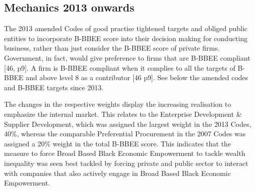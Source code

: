 \subsection{Mechanics 2013 onwards}
The 2013 amended Codes of good practise tightened targets and obliged public entities to incorporate B-BBEE score into their decision making for conducting business, rather than just consider the B-BBEE score of private firms. Government, in fact, would give preference to firms that are B-BBEE compliant [46, p9]. A firm is B-BBEE compliant when it complies to all the targets of B-BBEE and above level 8 as a contributor [46 p9]. See below the amended codes and B-BBEE targets since 2013.
\begin{table}[H] %
\centering
\caption{B-BBEE Codes of good practise 2007} 
\end{table} 
The changes in the respective weights display the increasing realisation to emphasize the internal market. This relates to the Enterprise Development & Supplier Development, which was assigned the largest weight in the 2013 Codes, 40\%, whereas the comparable Preferential Procurement in the 2007 Codes was assigned a 20\% weight in the total B-BBEE score. This indicates that the measure to force Broad Based Black Economic Empowerment to tackle wealth inequality was seen best tackled by forcing private and public sector to interact with companies that also actively engage in Broad Based Black Economic Empowerment.
